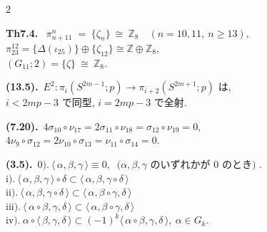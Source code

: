 \documentclass[10pt, leqno]{ltjsarticle}
\newcommand{\todas}[1]{\langle\,#1\,\rangle}
\newcommand{\gen}[1]{\{#1\}}       %
\newcommand{\pis}[2]{\pi_{#1}(#2)}       %
\newcommand{\pit}[2]{\pi_{#1}^{#2}}
\numberwithin{equation}{section}
\theoremstyle{plain}
\theoremstyle{definition}
\theoremstyle{remark}
\begin{document}
\begin{paracol}{2}
\switchcolumn

\noindent
\textbf{Th7.4.}\
\(\pit{n+11}{n} \;=\; \gen{\zeta_{n}}\ \cong\ \mathbb Z_{8}\quad (n=10,11, \ n\ge13),\) \\
\(\pit{23}{12} = \gen{\Delta(\iota_{25})}\oplus\gen{\zeta_{12}}\cong\mathbb Z\oplus\mathbb Z_{8},\)\\
\((G_{11};2)=\gen{\zeta}\ \cong\ \mathbb Z_{8}.\)

\noindent
\textbf{(13.5).}\
\(E^2:\pis{i}{S^{2m-1};p}\to \pis{i+2}{S^{2m+1}; p}\)
は,\\
\(i<2mp-3\) で同型, \(i=2mp-3\) で全射.

\noindent
\textbf{(7.20).}\
\(4\sigma_{10}\circ\nu_{17}
=2\sigma_{11}\circ\nu_{18}
=\sigma_{12}\circ\nu_{19}=0,\)\\
\(4\nu_{9}\circ\sigma_{12}
=2\nu_{10}\circ\sigma_{13}
=\nu_{11}\circ\sigma_{14}=0.\)

\noindent
\textbf{(3.5).}\
\(\text{0).}\ \todas{\alpha, \beta, \gamma}\equiv 0,
\ \text{ ($\alpha,\beta,\gamma$ のいずれかが $0$ のとき) }\).\\
\(\text{i).}\ \todas{\alpha, \beta, \gamma}\circ\delta
\subset \todas{\alpha, \beta, \gamma\circ\delta}\)\\
\(\text{ii).}\ \todas{\alpha, \beta, \gamma\circ\delta}
\subset \todas{\alpha, \beta\circ\gamma, \delta}\)\\
\(\text{iii).}\ \todas{\alpha\circ\beta, \gamma, \delta}
\subset \todas{\alpha, \beta\circ\gamma, \delta}\)\\
\(\text{iv).}\ \alpha\circ\todas{\beta, \gamma, \delta}
\subset (-1)^k\todas{\alpha\circ\beta, \gamma, \delta},\ \alpha\in G_k .\)


\end{paracol}
\end{document}

